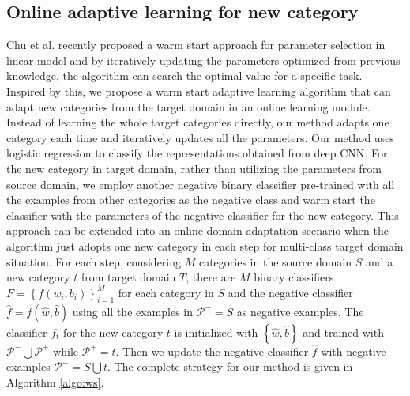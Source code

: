 \subsection{Online adaptive learning for new category}
Chu et al. recently proposed a warm start approach for parameter selection in linear model and by iteratively updating the parameters optimized from previous knowledge, the algorithm can search the optimal value for a specific task\cite{chuwarm}. Inspired by this, we propose a warm start adaptive learning algorithm that can adapt new categories from the target domain in an online learning module. Instead of learning the whole target categories directly, our method adapts one category each time and iteratively updates all the parameters. 
Our method uses logistic regression to classify the representations obtained from deep CNN. 
For the new category in target domain, rather than utilizing the parameters from source domain, we employ another negative binary classifier pre-trained with all the examples from other categories as the negative class and warm start the classifier with the parameters of the negative classifier for the new category. This approach can be extended into an online domain adaptation scenario when the algorithm just adopts one new category in each step for multi-class target domain situation. For each step, considering $M$ categories in the source domain $S$ and a new category $t$ from target domain $T$, there are $M$ binary classifiers $F=\left\{ {{f}\left( {{w_i},{b_i}} \right)} \right\}_{i = 1}^M$ for each category in $S$ and the negative classifier $\hat{f}=f(\hat{w},\hat{b})$ using all the examples in $\mathcal{P^-}=S$ as negative examples. The classifier $f_t$ for the new category $t$ is initialized with $\left\{\hat{w},\hat{b}\right\}$ and trained with $\mathcal{P^-}\bigcup\mathcal{P^+}$ while $\mathcal{P^+}=t$. Then we update the negative classifier $\hat{f}$ with negative examples $\mathcal{P^-}=S\bigcup t$. The complete strategy for our method is given in Algorithm \ref{algo:ws}.
